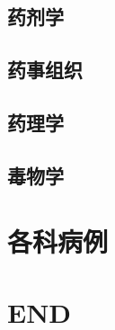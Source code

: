 \documentclass[UTF8]{../ApplicationUniverse}
\begin{document}
\section{药剂学}
\section{药事组织}
\section{药理学}
\section{毒物学}


\chapter{各科病例}








\chapter{END}
\end{document}
